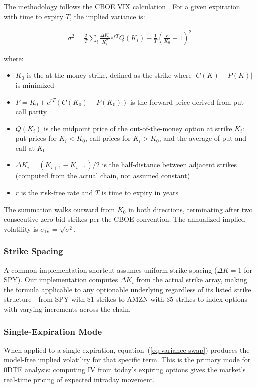 \documentclass[11pt, a4paper]{article}
\begin{document}
The methodology follows the CBOE VIX calculation \cite{cboe2023vix}. For a given expiration with time to expiry $T$, the implied variance is:

\begin{align}
\sigma^2 = \frac{2}{T} \sum_i \frac{\Delta K_i}{K_i^2} e^{rT} Q(K_i) - \frac{1}{T}\left(\frac{F}{K_0} - 1\right)^2
\label{eq:variance-swap}
\end{align}

where:
\begin{itemize}
    \item $K_0$ is the at-the-money strike, defined as the strike where $|C(K) - P(K)|$ is minimized
    \item $F = K_0 + e^{rT}(C(K_0) - P(K_0))$ is the forward price derived from put-call parity
    \item $Q(K_i)$ is the midpoint price of the out-of-the-money option at strike $K_i$: put prices for $K_i < K_0$, call prices for $K_i > K_0$, and the average of put and call at $K_0$
    \item $\Delta K_i = (K_{i+1} - K_{i-1})/2$ is the half-distance between adjacent strikes (computed from the actual chain, not assumed constant)
    \item $r$ is the risk-free rate and $T$ is time to expiry in years
\end{itemize}

The summation walks outward from $K_0$ in both directions, terminating after two consecutive zero-bid strikes per the CBOE convention. The annualized implied volatility is $\sigma_{\text{IV}} = \sqrt{\sigma^2}$.

\subsubsection{Strike Spacing}

A common implementation shortcut assumes uniform strike spacing ($\Delta K = 1$ for SPY). Our implementation computes $\Delta K_i$ from the actual strike array, making the formula applicable to any optionable underlying regardless of its listed strike structure---from SPY with \$1 strikes to AMZN with \$5 strikes to index options with varying increments across the chain.

\subsubsection{Single-Expiration Mode}

When applied to a single expiration, equation~(\ref{eq:variance-swap}) produces the model-free implied volatility for that specific term. This is the primary mode for 0DTE analysis: computing IV from today's expiring options gives the market's real-time pricing of expected intraday movement.
\end{document}
